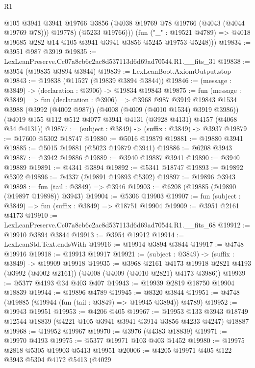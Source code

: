 \begin{lexlean}{R1}
\begin{coremodule}
              @105
              @3941
              @3941
              @19766
              @3856
              (@4038 @19769 @78 @19766 (@4043 (@4044 @19769 @78)))
              @19778)
            (@5233 @19766)))
        (fun ("_" : @19521 @4789) =>
        @4018 @19685 @282 @14 @105 @3941 @3941 @3856 @5245 @19753 @5248)))
@19834 := @3951 @987 @3919
@19835 := LexLeanPreserve.Cc07a8cb6c2ac8d537113d6d69ad70544.R1.__fits_31
@19838 := @3954 (@19835 @3894 @3844)
@19839 := LexLeanBoot.AxiomOutput.stop
@19843 := @19838 (@11527 (@19839 @3894 @3844))
@19846 := (message : @3849) -> (declaration : @3906) -> @19834 @19843
@19875 := fun (message : @3849) =>
  fun (declaration : @3906) =>
  @3968
    @987
    @3919
    @19843
    @1534
    @3988
    (@3992 (@4002 @987))
    (@4008 (@4009 (@4010 @1534) @3919 @3986))
    (@4019 @155 @112 @512 @4077 @3941 @4131 (@3928 @4131) @4157 (@4068 @34 @4131))
@19877 := (subject : @3849) -> (suffix : @3849) -> @3937
@19879 := @17600 @5302 @18747
@19880 := @5016 @19879
@19881 := @19880 @3941
@19885 := @5015 @19881 (@5023 @19879 @3941)
@19886 := @6208 @3943
@19887 := @3942 @19886
@19889 := @3940 @19887 @3941
@19890 := @3940 @19889
@19891 := @4341 @3894
@19892 := @5341 @18747
@19893 := @19892 @5302
@19896 := @4337 (@19891 @19893 @5302)
@19897 := @19896 @3943
@19898 := fun (tail : @3849) => @3946
@19903 := @6208 (@19885 (@19890 (@19897 @19898)) @3943)
@19904 := @5306 @19903
@19907 := fun (subject : @3849) => fun (suffix : @3849) => @18751 @19904
@19909 := @3951 @2161 @4173
@19910 := LexLeanPreserve.Cc07a8cb6c2ac8d537113d6d69ad70544.R1.__fits_68
@19912 := @19910 @3894 @3844
@19913 := @3954 @19912
@19914 := LexLeanStd.Text.endsWith
@19916 := @19914 @3894 @3844
@19917 := @4748 @19916
@19918 := @19913 @19917
@19921 := (subject : @3849) -> (suffix : @3849) -> @19909 @19918
@19935 := @3968
    @2161
    @4173
    @19918
    @2821
    @4193
    (@3992 (@4002 @2161))
    (@4008 (@4009 (@4010 @2821) @4173 @3986))
@19939 := @5377 @4193 @34 @403 @407
@19943 := @19939 @2819 @18750 @19904 @18839
@19944 := @19896 @4789
@19945 := @8320 @3844
@19951 := @4748 (@19885 (@19944 (fun (tail : @3849) => @19945 @3894)) @4789)
@19952 := @19943 @19951
@19953 := @4206 @405
@19967 := @19953
    @133
    @3943
    @18749
    @12544
    @18839
    (@4221 @105 @3941 @3941 @3914 @3856 @4233 @4247)
    @18887
@19968 := @19952 @19967
@19970 := @3976 (@4383 @18839)
@19971 := @19970 @4193
@19975 := @5377 @19971 @103 @403 @1452
@19980 := @19975 @2818 @5305 @19903 @5413 @19951
@20006 := @4205
    @19971
    @405
    @122
    @3943
    @5304
    @4172
    @5413
    (@4029

\end{coremodule}
\end{lexlean}
